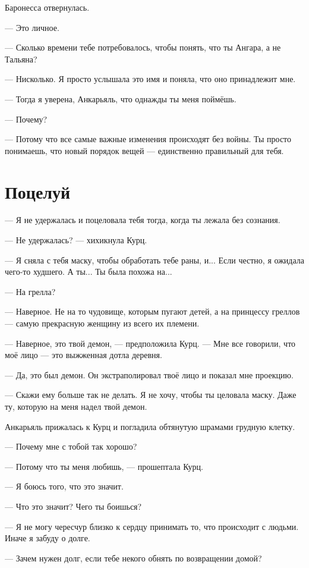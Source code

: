 \documentclass[a4paper,10pt,fleqn]{book}\usepackage{polyglossia}\setdefaultlanguage{english}\setotherlanguage{russian}\defaultfontfeatures{Ligatures=TeX,Mapping=tex-text}\usepackage{xcolor}\definecolor{lightgray}{HTML}{bbbbbb}\color{lightgray}\newcommand{\ml}[3]{\textcolor{black}{#3}}
\begin{document}
Баронесса отвернулась.

--- Это личное.

--- Сколько времени тебе потребовалось, чтобы понять, что ты Ангара, а не Тальяна?

--- Нисколько.
Я просто услышала это имя и поняла, что оно принадлежит мне.

--- Тогда я уверена, Анкарьяль, что однажды ты меня поймёшь.

--- Почему?

--- Потому что все самые важные изменения происходят без войны.
Ты просто понимаешь, что новый порядок вещей --- единственно правильный для тебя.

\section{Поцелуй}

--- Я не удержалась и поцеловала тебя тогда, когда ты лежала без сознания.

--- Не удержалась? --- хихикнула Курц.

--- Я сняла с тебя маску, чтобы обработать тебе раны, и...
Если честно, я ожидала чего-то худшего.
А ты...
Ты была похожа на...

--- На грелла?

--- Наверное.
Не на то чудовище, которым пугают детей, а на принцессу греллов --- самую прекрасную женщину из всего их племени.

--- Наверное, это твой демон, --- предположила Курц.
--- Мне все говорили, что моё лицо --- это выжженная дотла деревня.

--- Да, это был демон.
Он экстраполировал твоё лицо и показал мне проекцию.

--- Скажи ему больше так не делать.
Я не хочу, чтобы ты целовала маску.
Даже ту, которую на меня надел твой демон.

Анкарьяль прижалась к Курц и погладила обтянутую шрамами грудную клетку.

--- Почему мне с тобой так хорошо?

--- Потому что ты меня любишь, --- прошептала Курц.

--- Я боюсь того, что это значит.

--- Что это значит?
Чего ты боишься?

--- Я не могу чересчур близко к сердцу принимать то, что происходит с людьми.
Иначе я забуду о долге.

--- Зачем нужен долг, если тебе некого обнять по возвращении домой?
\end{document}
